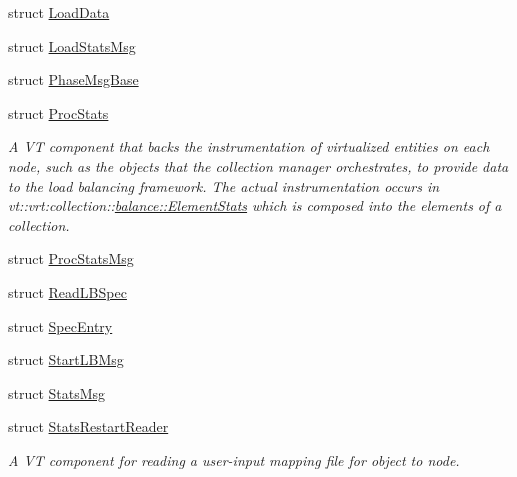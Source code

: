 \begin{DoxyCompactItemize}
struct \hyperlink{structvt_1_1vrt_1_1collection_1_1balance_1_1_load_data}{Load\+Data}
\item 
struct \hyperlink{structvt_1_1vrt_1_1collection_1_1balance_1_1_load_stats_msg}{Load\+Stats\+Msg}
\item 
struct \hyperlink{structvt_1_1vrt_1_1collection_1_1balance_1_1_phase_msg_base}{Phase\+Msg\+Base}
\item 
struct \hyperlink{structvt_1_1vrt_1_1collection_1_1balance_1_1_proc_stats}{Proc\+Stats}
\begin{DoxyCompactList}\small\item\em A VT component that backs the instrumentation of virtualized entities on each node, such as the objects that the collection manager orchestrates, to provide data to the load balancing framework. The actual instrumentation occurs in {\ttfamily vt\+::vrt\+:collection\+:}\+:\hyperlink{structvt_1_1vrt_1_1collection_1_1balance_1_1_element_stats}{balance\+::\+Element\+Stats} which is composed into the elements of a collection. \end{DoxyCompactList}\item 
struct \hyperlink{structvt_1_1vrt_1_1collection_1_1balance_1_1_proc_stats_msg}{Proc\+Stats\+Msg}
\item 
struct \hyperlink{structvt_1_1vrt_1_1collection_1_1balance_1_1_read_l_b_spec}{Read\+L\+B\+Spec}
\item 
struct \hyperlink{structvt_1_1vrt_1_1collection_1_1balance_1_1_spec_entry}{Spec\+Entry}
\item 
struct \hyperlink{structvt_1_1vrt_1_1collection_1_1balance_1_1_start_l_b_msg}{Start\+L\+B\+Msg}
\item 
struct \hyperlink{structvt_1_1vrt_1_1collection_1_1balance_1_1_stats_msg}{Stats\+Msg}
\item 
struct \hyperlink{structvt_1_1vrt_1_1collection_1_1balance_1_1_stats_restart_reader}{Stats\+Restart\+Reader}
\begin{DoxyCompactList}\small\item\em A VT component for reading a user-\/input mapping file for object to node. \end{DoxyCompactList}\end{DoxyCompactItemize}
